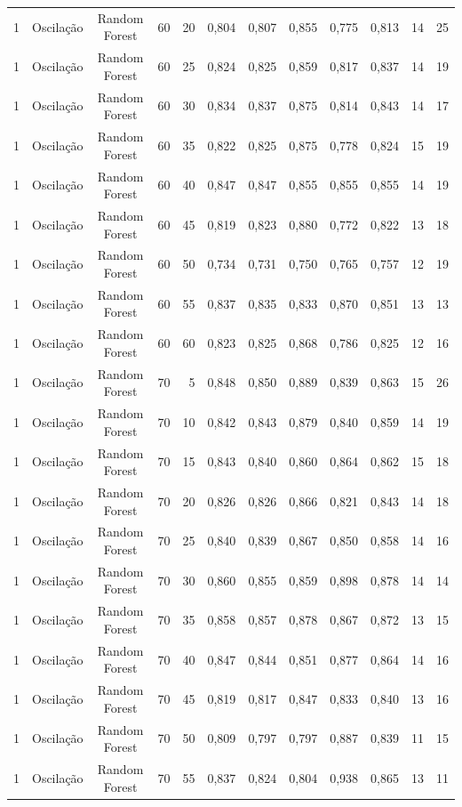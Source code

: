\begin{longtable}{ccclrrrrrrrr}
1 & Oscilação & Random Forest & 60 & 20 & 0,804 & 0,807 & 0,855 & 0,775 & 0,813 & 14 & 25 \\
1 & Oscilação & Random Forest & 60 & 25 & 0,824 & 0,825 & 0,859 & 0,817 & 0,837 & 14 & 19 \\
1 & Oscilação & Random Forest & 60 & 30 & 0,834 & 0,837 & 0,875 & 0,814 & 0,843 & 14 & 17 \\
1 & Oscilação & Random Forest & 60 & 35 & 0,822 & 0,825 & 0,875 & 0,778 & 0,824 & 15 & 19 \\
1 & Oscilação & Random Forest & 60 & 40 & 0,847 & 0,847 & 0,855 & 0,855 & 0,855 & 14 & 19 \\
1 & Oscilação & Random Forest & 60 & 45 & 0,819 & 0,823 & 0,880 & 0,772 & 0,822 & 13 & 18 \\
1 & Oscilação & Random Forest & 60 & 50 & 0,734 & 0,731 & 0,750 & 0,765 & 0,757 & 12 & 19 \\
1 & Oscilação & Random Forest & 60 & 55 & 0,837 & 0,835 & 0,833 & 0,870 & 0,851 & 13 & 13 \\
1 & Oscilação & Random Forest & 60 & 60 & 0,823 & 0,825 & 0,868 & 0,786 & 0,825 & 12 & 16 \\
1 & Oscilação & Random Forest & 70 & 5 & 0,848 & 0,850 & 0,889 & 0,839 & 0,863 & 15 & 26 \\
1 & Oscilação & Random Forest & 70 & 10 & 0,842 & 0,843 & 0,879 & 0,840 & 0,859 & 14 & 19 \\
1 & Oscilação & Random Forest & 70 & 15 & 0,843 & 0,840 & 0,860 & 0,864 & 0,862 & 15 & 18 \\
1 & Oscilação & Random Forest & 70 & 20 & 0,826 & 0,826 & 0,866 & 0,821 & 0,843 & 14 & 18 \\
1 & Oscilação & Random Forest & 70 & 25 & 0,840 & 0,839 & 0,867 & 0,850 & 0,858 & 14 & 16 \\
1 & Oscilação & Random Forest & 70 & 30 & 0,860 & 0,855 & 0,859 & 0,898 & 0,878 & 14 & 14 \\
1 & Oscilação & Random Forest & 70 & 35 & 0,858 & 0,857 & 0,878 & 0,867 & 0,872 & 13 & 15 \\
1 & Oscilação & Random Forest & 70 & 40 & 0,847 & 0,844 & 0,851 & 0,877 & 0,864 & 14 & 16 \\
1 & Oscilação & Random Forest & 70 & 45 & 0,819 & 0,817 & 0,847 & 0,833 & 0,840 & 13 & 16 \\
1 & Oscilação & Random Forest & 70 & 50 & 0,809 & 0,797 & 0,797 & 0,887 & 0,839 & 11 & 15 \\
1 & Oscilação & Random Forest & 70 & 55 & 0,837 & 0,824 & 0,804 & 0,938 & 0,865 & 13 & 11 \\

\end{longtable}
